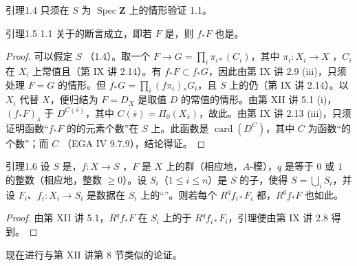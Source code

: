 \begin{SGAresult}{引理}{1.4}
只须在 $S$ 为 $\operatorname{Spec}\mathbf Z$ 上的情形验证 1.1。
\end{SGAresult}
\begin{SGAresult}{引理}{1.5}
1.1 关于的断言成立，即若 $F$ 是，则 $f_*F$ 也是。
\end{SGAresult}
\begin{proof}
可以假定 $S$ （1.4）。取一个 $F\to G=\prod_i\pi_{i*}(C_i)$，其中 $\pi_i:X_i\to X$ ，$C_i$ 在 $X_i$ 上常值且（第 IX 讲 2.14）。有 $f_*F\subset f_*G$，因此由第 IX 讲 2.9 (iii)，只须处理 $F=G$ 的情形。但 $f_*G=\prod_i(f\pi_i)_*G_i$，且 $S$ 上的仍（第 IX 讲 2.14）。以 $X_i$ 代替 $X$，便归结为 $F=D_X$ 是取值 $D$ 的常值的情形。由第 XII 讲 5.1 (i)， $(f_*F)_{\bar s}$ 于 $D^{C(\bar s)}$，其中 $C(\bar s)=\Pi_0(X_{\bar s})$，故此。由第 IX 讲 2.13 (iii)，只须证明函数“$f_*F$ 的的元素个数”在 $S$ 上。此函数是 $\operatorname{card}(D^C)$，其中 $C$ 为函数“的个数”；而 $C$ （EGA IV 9.7.9），结论得证。
\end{proof}
\begin{SGAresult}{引理}{1.6}
设 $S$ 是，$f:X\to S$ ，$F$ 是 $X$ 上的群（相应地，$A$-模），$q$ 是等于 $0$ 或 $1$ 的整数（相应地，整数 $\geq0$）。设 $S_i$（$1\leq i\leq n$）是 $S$ 的子，使得 $S=\bigcup_iS_i$，并设 $F_i$、$f_i:X_i\to S_i$ 是数据在 $S_i$ 上的“”。则若每个 $R^qf_{i*}F_i$ 都，$R^qf_*F$ 也如此。
\end{SGAresult}
\begin{proof}
由第 XII 讲 5.1，$R^qf_*F$ 在 $S_i$ 上的于 $R^qf_{i*}F_i$，引理便由第 IX 讲 2.8 得到。
\end{proof}
现在进行与第 XII 讲第 8 节类似的论证。
